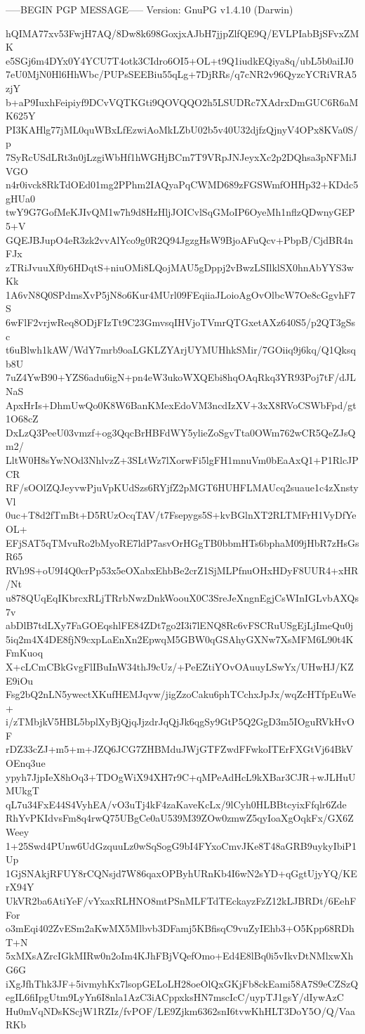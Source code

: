 -----BEGIN PGP MESSAGE-----
Version: GnuPG v1.4.10 (Darwin)

hQIMA77xv53FwjH7AQ/8Dw8k698GoxjxAJbH7jjpZlfQE9Q/EVLPIabBjSFvxZMK
e5SGj6m4DYx0Y4YCU7T4otk3CIdro6OI5+OL+t9Q1iudkEQiya8q/ubL5b0aiIJ0
7eU0MjN0Hl6HhWbc/PUPsSEEBiu55qLg+7DjRRs/q7cNR2v96QyzcYCRiVRA5zjY
b+aP9IuxhFeipiyf9DCvVQTKGti9QOVQQO2h5LSUDRc7XAdrxDmGUC6R6aMK625Y
PI3KAHlg77jML0quWBxLfEzwiAoMkLZbU02b5v40U32djfzQjnyV4OPx8KVa0S/p
7SyRcUSdLRt3n0jLzgiWbHf1hWGHjBCm7T9VRpJNJeyxXc2p2DQhsa3pNFMiJVGO
n4r0ivck8RkTdOEd01mg2PPhm2IAQyaPqCWMD689zFGSWmfOHHp32+KDdc5gHUa0
twY9G7GofMeKJIvQM1w7h9d8HzHljJOICvlSqGMoIP6OyeMh1nflzQDwnyGEP5+V
GQEJBJupO4eR3zk2vvAlYco9g0R2Q94JgzgHsW9BjoAFuQcv+PbpB/CjdBR4nFJx
zTRiJvuuXf0y6HDqtS+niuOMi8LQojMAU5gDppj2vBwzLSIlklSX0hnAbYYS3wKk
1A6vN8Q0SPdmsXvP5jN8o6Kur4MUrl09FEqiiaJLoioAgOvOlbcW7Oe8cGgvhF7S
6wFlF2vrjwReq8ODjFIzTt9C23GmvsqIHVjoTVmrQTGxetAXz640S5/p2QT3gSsc
t6uBlwh1kAW/WdY7mrb9oaLGKLZYArjUYMUHhkSMir/7GOiiq9j6kq/Q1Qksqb8U
7uZ4YwB90+YZS6adu6igN+pn4eW3ukoWXQEbi8hqOAqRkq3YR93Poj7tF/dJLNaS
ApxHrIs+DhmUwQo0K8W6BanKMexEdoVM3ncdIzXV+3xX8RVoCSWbFpd/gt1O68cZ
DxLzQ3PeeU03vmzf+og3QqcBrHBFdWY5ylieZoSgvTta0OWm762wCR5QeZJsQm2/
LltW0H8sYwNOd3NhlvzZ+3SLtWz7lXorwFi5lgFH1mnuVm0bEaAxQ1+P1RlcJPCR
RF/sOOlZQJeyvwPjuVpKUdSzs6RYjfZ2pMGT6HUHFLMAUcq2suaue1c4zXnstyVl
0uc+T8d2fTmBt+D5RUzOcqTAV/t7Fsepygs5S+kvBGlnXT2RLTMFrH1VyDfYeOL+
EFjSAT5qTMvuRo2bMyoRE7ldP7asvOrHGgTB0bbmHTs6bphaM09jHbR7zHsGsR65
RVh9S+oU9I4Q0crPp53x5eOXabxEhbBe2crZ1SjMLPfnuOHxHDyF8UUR4+xHR/Nt
u878QUqEqIKbrcxRLjTRrbNwzDnkWoouX0C3SreJeXngnEgjCsWInIGLvbAXQs7v
abDlB7tdLXy7FaGOEqshlFE84ZDt7go2I3i7lENQ8Rc6vFSCRuUSgEjLjImeQu0j
5iq2m4X4DE8fjN9cxpLaEnXn2EpwqM5GBW0qGSAhyGXNw7XsMFM6L90t4KFmKuoq
X+cLCmCBkGvgFlIBuInW34thJ9cUz/+PeEZtiYOvOAuuyLSwYx/UHwHJ/KZE9iOu
Fsg2bQ2nLN5ywectXKufHEMJqvw/jigZzoCaku6phTCchxJpJx/wqZcHTfpEuWe+
i/zTMbjkV5HBL5bplXyBjQjqJjzdrJqQjJk6qgSy9GtP5Q2GgD3m5IOguRVkHvOF
rDZ33cZJ+m5+m+JZQ6JCG7ZHBMduJWjGTFZwdFFwkoITErFXGtVj64BkVOEnq3ue
ypyh7JjpIeX8hOq3+TDOgWiX94XH7r9C+qMPeAdHcL9kXBar3CJR+wJLHuUMUkgT
qL7u34FxE44S4VyhEA/vO3uTj4kF4zaKaveKcLx/9lCyh0HLBBtcyixFfqlr6Zde
RhYvPKIdvsFm8q4rwQ75UBgCe0aU539M39ZOw0zmwZ5qyIoaXgOqkFx/GX6ZWeey
1+25Swd4PUnw6UdGzquuLz0wSqSogG9bI4FYxoCmvJKe8T48aGRB9uykyIbiP1Up
1GjSNAkjRFUY8rCQNsjd7W86qaxOPByhURnKb4I6wN2sYD+qGgtUjyYQ/KErX94Y
UkVR2ba6AtiYeF/vYxaxRLHNO8mtPSnMLFTdTEckayzFzZ12kLJBRDt/6EehFFor
o3mEqi402ZvESm2aKwMX5Mlbvb3DFamj5KBfisqC9vuZyIEhb3+O5Kpp68RDhT+N
5xMXsAZrcIGkMIRw0n2oIm4KJhFBjVQefOmo+Ed4E8lBq0i5vIkvDtNMlxwXhG6G
iXgJfhThk3JF+5ivmyhKx7lsopGELoLH28oeOlQxGKjFb8ckEami58A7S9eCZSzQ
egIL6fiIpgUtm9LyYn6I8nla1AzC3iACppxksHN7mscIcC/uypTJ1gsY/dIywAzC
Hu0mVqNDsKScjW1RZIz/fvPOF/LE9Zjkm6362snI6tvwKhHLT3DoY5O/Q/VaaRKb
